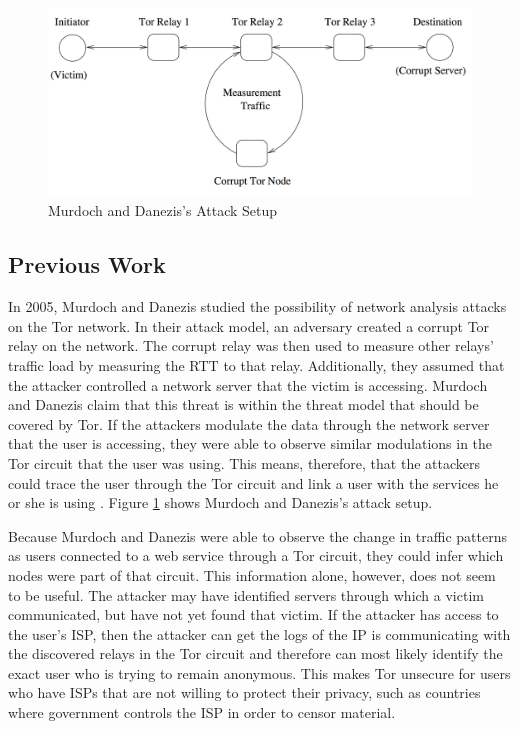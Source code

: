 \documentclass[12pt,journal]{IEEEtran}
\begin{document}
\begin{figure}

 \center
  \includegraphics[width=\textwidth]{figures/murdochattacksetup.png}
  \caption{Murdoch and Danezis's Attack Setup \cite{Murdoch:2005:LTA:1058433.1059390}}
  \label{murdochsetup}
\end{figure}

\subsection{Previous Work}
In 2005, Murdoch and Danezis studied the possibility of network analysis attacks on the Tor network. In their attack model, an adversary created a corrupt Tor relay on the network. The corrupt relay was then used to measure other relays' traffic load by measuring the RTT to that relay. Additionally, they assumed that the attacker controlled a network server that the victim is accessing. Murdoch and Danezis claim that this threat is within the threat model that should be covered by Tor. If the attackers modulate the data through the network server that the user is accessing, they were able to observe similar modulations in the Tor circuit that the user was using. This means, therefore, that the attackers could trace the user through the Tor circuit and link a user with the services he or she is using \cite{Murdoch:2005:LTA:1058433.1059390}. Figure \ref{murdochsetup} shows Murdoch and Danezis's attack setup.
\par
Because Murdoch and Danezis were able to observe the change in traffic patterns as users connected to a web service through a Tor circuit, they could infer which nodes were part of that circuit. This information alone, however, does not seem to be useful. The attacker may have identified servers through which a victim communicated, but have not yet found that victim. If the attacker has access to the user's ISP, then the attacker can get the logs of the IP is communicating with the discovered relays in the Tor circuit and therefore can most likely identify the exact user who is trying to remain anonymous. This makes Tor unsecure for users who have ISPs that are not willing to protect their privacy, such as countries where government controls the ISP in order to censor material.
\end{document}

